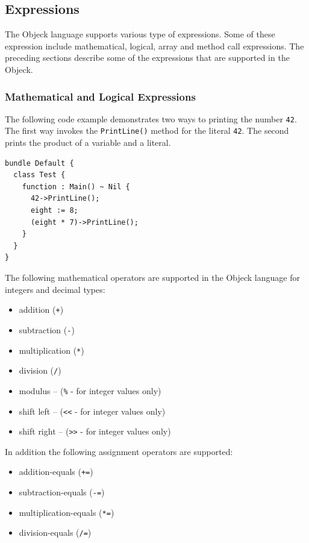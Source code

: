 \documentclass[12pt]{article}
\begin{document}
\subsection{Expressions}
The Objeck language supports various type of expressions.  Some of these expression include mathematical, logical, array and method call expressions.  The preceding sections describe some of the expressions that are supported in the Objeck.

\subsubsection{Mathematical and Logical Expressions}
The following code example demonstrates two ways to printing the number \texttt{42}.  The first way invokes the \texttt{PrintLine()} method for the literal \texttt{42}.  The second prints the product of a variable and a literal.

\begin{verbatim}
bundle Default {
  class Test {
    function : Main() ~ Nil {
      42->PrintLine();
      eight := 8;
      (eight * 7)->PrintLine();
    }
  }
}
\end{verbatim}

The following mathematical operators are supported in the Objeck language for integers and decimal types:
\begin{itemize}
    \item addition (\texttt{+})
    \item subtraction (\texttt{-})
    \item multiplication (\texttt{*})
    \item division (\texttt{/})
    \item modulus -- (\texttt{\%} - for integer values only)
    \item shift left -- (\texttt{<<} - for integer values only)
    \item shift right -- (\texttt{>>} - for integer values only)
\end{itemize}

In addition the following assignment operators are supported:
\begin{itemize}
    \item addition-equals (\texttt{+=})
    \item subtraction-equals (\texttt{-=})
    \item multiplication-equals (\texttt{*=})
    \item division-equals (\texttt{/=})
\end{itemize}
\end{document}
